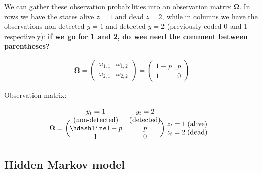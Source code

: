 \documentclass[
  12pt,
]{krantz}
\begin{document}
We can gather these observation probabilities into an observation matrix \(\mathbf{\Omega}\). In rows we have the states alive \(z = 1\) and dead \(z = 2\), while in columns we have the observations non-detected \(y = 1\) and detected \(y = 2\) (previously coded 0 and 1 respectively): \textbf{if we go for 1 and 2, do wee need the comment between parentheses?}

\begin{align*}
\mathbf{\Omega} =
\left(\begin{array}{cc}
\omega_{1,1} & \omega_{1,2}\\
\omega_{2,1} & \omega_{2,2}
\end{array}\right) =
\left(\begin{array}{cc}
1 - p & p\\
1 & 0
\end{array}\right)
\end{align*}

Observation matrix:

\[
\begin{matrix}
& \\
\mathbf{\Omega} =
    \left ( \vphantom{ \begin{matrix} 12 \\ 12 \end{matrix} } \right .
\end{matrix}
\hspace{-1.2em}
\begin{matrix}
    y_t=1 & y_t=2 \\
    \mbox{(non-detected)} & \mbox{(detected)} \\ \hdashline
1 - p & p\\
1 & 0\\
\end{matrix}
\hspace{-0.2em}
\begin{matrix}
& \\
\left . \vphantom{ \begin{matrix} 12 \\ 12 \end{matrix} } \right )
    \begin{matrix}
    z_{t}=1 \; \mbox{(alive)}\\ z_{t}=2 \; \mbox{(dead)}
    \end{matrix}
\end{matrix}
\]

\hypertarget{hidden-markov-model}{%
\subsection{Hidden Markov model}\label{hidden-markov-model}}
\end{document}
